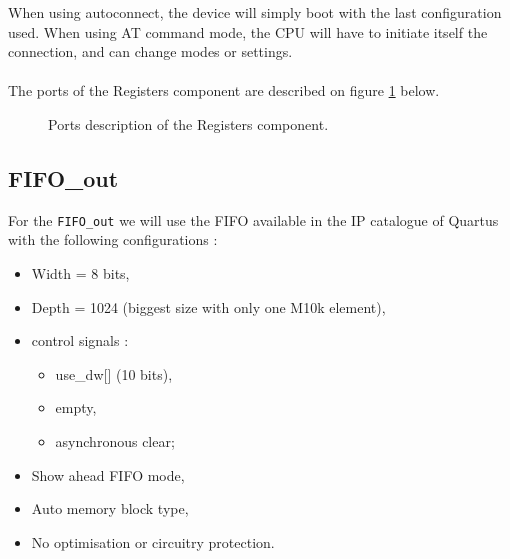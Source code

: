 \documentclass[11pt]{article}
\begin{document}
When using autoconnect, the device will simply boot with the last configuration used. When using AT command mode, the CPU will have to initiate itself the connection, and can change modes or settings.
\\\\
The ports of the Registers component are described on figure \ref{reg_ports} below.
\begin{figure}[H]
        \caption{Ports description of the Registers component.}
        \label{reg_ports}
\end{figure}

\subsection{FIFO\_out}
For the \texttt{FIFO\_out} we will use the FIFO available in the IP catalogue of Quartus with the following configurations :
\begin{itemize}
    \item Width = 8 bits,
    \item Depth = 1024 (biggest size with only one M10k element),
    \item control signals : \begin{itemize}
        \item use\_dw[] (10 bits),
        \item empty,
        \item asynchronous clear; \end{itemize}
    \item Show ahead FIFO mode,
    \item Auto memory block type,
    \item No optimisation or circuitry protection.
\end{itemize}
\end{document}
